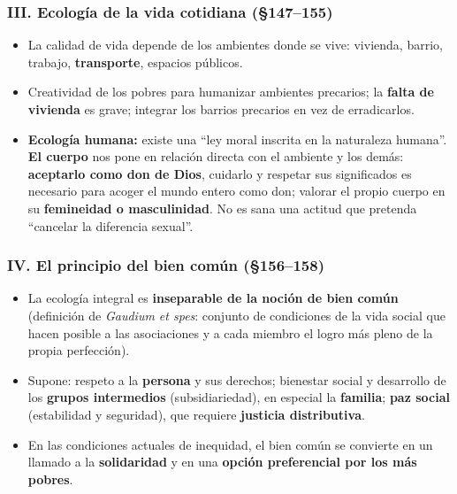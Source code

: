 \documentclass[10pt,a4paper]{article}
\begin{document}
\subsubsection{III. Ecología de la vida cotidiana (\S{}147--155)}
\begin{itemize}
\item La calidad de vida depende de los ambientes donde se vive: vivienda, barrio, trabajo, \textbf{transporte}, espacios públicos.
\item Creatividad de los pobres para humanizar ambientes precarios; la \textbf{falta de vivienda} es grave; integrar los barrios precarios en vez de erradicarlos.
\item \textbf{Ecología humana:} existe una ``ley moral inscrita en la naturaleza humana''. \textbf{El cuerpo} nos pone en relación directa con el ambiente y los demás: \textbf{aceptarlo como don de Dios}, cuidarlo y respetar sus significados es necesario para acoger el mundo entero como don; valorar el propio cuerpo en su \textbf{femineidad o masculinidad}. No es sana una actitud que pretenda ``cancelar la diferencia sexual''.
\end{itemize}

\subsubsection{IV. El principio del bien común (\S{}156--158)}
\begin{itemize}
\item La ecología integral es \textbf{inseparable de la noción de bien común} (definición de \textit{Gaudium et spes}: conjunto de condiciones de la vida social que hacen posible a las asociaciones y a cada miembro el logro más pleno de la propia perfección).
\item Supone: respeto a la \textbf{persona} y sus derechos; bienestar social y desarrollo de los \textbf{grupos intermedios} (subsidiariedad), en especial la \textbf{familia}; \textbf{paz social} (estabilidad y seguridad), que requiere \textbf{justicia distributiva}.
\item En las condiciones actuales de inequidad, el bien común se convierte en un llamado a la \textbf{solidaridad} y en una \textbf{opción preferencial por los más pobres}.
\end{itemize}
\end{document}
